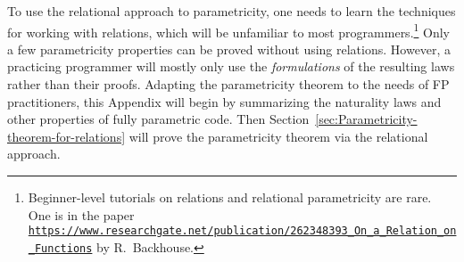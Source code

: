 To use the relational approach to parametricity, one needs to learn
the techniques for working with relations, which will be unfamiliar
to most programmers.\footnote{Beginner-level tutorials on relations and relational parametricity
are rare. One is in the paper \texttt{\href{https://www.researchgate.net/publication/262348393_On_a_Relation_on_Functions}{https://www.researchgate.net/publication/262348393\_On\_a\_Relation\_on\_Functions}}
 by R.~Backhouse.} Only a few parametricity properties can be proved without using relations.
However, a practicing programmer will mostly only use the \emph{formulations}
of the resulting laws rather than their proofs. Adapting the parametricity
theorem to the needs of FP practitioners, this Appendix will begin
by summarizing the naturality laws and other properties of fully parametric
code. Then Section~\ref{sec:Parametricity-theorem-for-relations}
will prove the parametricity theorem via the relational approach.%
\begin{comment}
Section~\ref{sec:Commutativity-laws-for-type-constructors} proves
that fully parametric type constructors obey commutativity laws. Section~\ref{sec:Naturality-laws-for-fully-parametric-functions}
shows, without using relations, that fully parametric functions satisfy
dinaturality laws (a generalization of naturality laws to arbitrary
type signatures). An important consequence, proved in Section~\ref{sec:Uniqueness-of-functor-and-contrafunctor},
is that the code implementing the functor and contrafunctor typeclasses
is unique. Finally, Section~\ref{sec:Parametricity-theorem-for-relations}
explains the relational approach to parametricity and proves the relational
parametricity theorem. 

Additional literature:

{[}1{]}: Girard, J.-Y.; Scedrov, A. \& Scott, P. J. Normal Forms and
Cut-Free Proofs as Natural Transformations. Logic From Computer Science,
Mathematical Science Research Institute Publications 21, Springer-Verlag,
1992, 217-241. http://citeseer.ist.psu.edu/viewdoc/summary?doi=10.1.1.41.811

{[}2{]}: Bainbridge, E. S.; Freyd, P. J.; Scedrov, A. \& Scott, P.
J. Functorial polymorphism. Theoretical computer science, Elsevier,
1990, 70, 35-64. https://core.ac.uk/display/82270459

{[}3{]}: De Lataillade, J. Dinatural Terms in System F. Logic in Computer
Science, 24th Annual IEEE Symposium, 267-276, 2009. https://www.irif.fr/\textasciitilde delatail/dinat.pdf

{[}4{]}: Pistone, P. On completeness and parametricity in the realizability
semantics of System F. https://arxiv.org/abs/1802.05143

{[}5{]}: https://libres.uncg.edu/ir/asu/f/Johann\_Patricia\_2014\_A\_Relationally\_Parametric\_Model\_Of\_Dependent\_Type\_Theory..pdf

See discussion here: https://cstheory.stackexchange.com/questions/42256/is-case-analysis-on-normal-forms-of-lambda-terms-sufficient-to-prove-parametrici
\end{comment}

